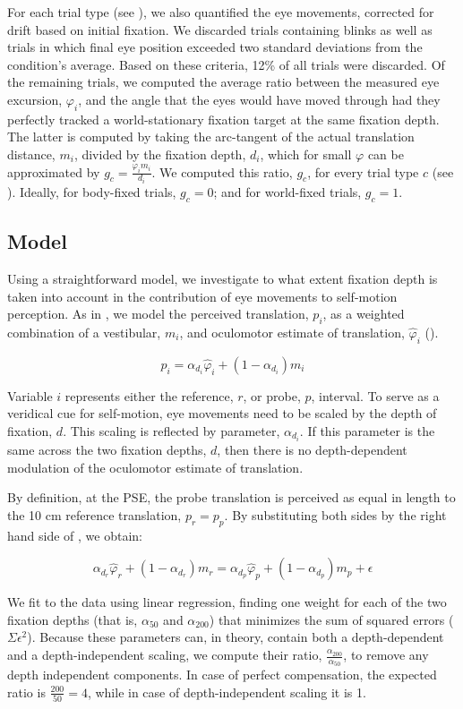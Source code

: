 For each trial type (see ), we also quantified the eye movements, corrected for drift based on initial fixation. We discarded trials containing blinks as well as trials in which final eye position exceeded two standard deviations from the condition's average. Based on these criteria, 12\% of all trials were discarded. Of the remaining trials, we computed the average ratio between the measured eye excursion, $\varphi_i$, and the angle that  the eyes would have  moved through had they perfectly tracked a world-stationary fixation target at the same fixation depth. The latter is computed by taking the arc-tangent of the actual translation distance, $m_i$, divided by the fixation depth, $d_i$, which for small $\varphi$ can be approximated by $g_c = \frac{\varphi_i m_i}{d_i}$. We computed this ratio, $g_c$, for every trial type $c$ (see ). Ideally, for body-fixed trials, $g_c = 0$; and for world-fixed trials, $g_c = 1$.


\subsection{Model}

Using a straightforward model, we investigate to what extent fixation depth is taken into account in the contribution of eye movements to self-motion perception. As in , we model the perceived translation, $p_i$, as a weighted combination of a vestibular, $m_i$, and oculomotor estimate of translation, $\hat{\varphi}_i$ ().

\begin{equation}
\label{p4:eq4}
p_i = \alpha_{d_i} \hat{\varphi}_i + (1 - \alpha_{d_i}) m_i
\end{equation}

Variable $i$ represents either the reference, $r$, or probe, $p$, interval. To serve as a veridical cue for self-motion, eye movements need to be scaled by the depth of fixation, $d$. This scaling is reflected by parameter, $\alpha_{d_i}$. If this parameter is the same across the two fixation depths, $d$, then there is no depth-dependent modulation of the oculomotor estimate of translation.

By definition, at the PSE, the probe translation is perceived as equal in length to the 10 cm reference translation, $p_r = p_p$. By substituting both sides by the right hand side of , we obtain:

\begin{equation}
\label{p4:eq5}
\alpha_{d_r} \hat{\varphi}_r + (1 - \alpha_{d_r}) m_r = \alpha_{d_p} \hat{\varphi}_p + (1 - \alpha_{d_p}) m_p + \epsilon
\end{equation}

We fit  to the data using linear regression, finding one weight for each of the two fixation depths (that is, $\alpha_{50}$ and $\alpha_{200}$) that minimizes the sum of squared errors ($\Sigma \epsilon^2$). Because these parameters can, in theory, contain both a depth-dependent and a depth-independent scaling, we compute their ratio, $\frac{\alpha_{200}}{\alpha_{50}}$, to remove any depth independent components. In case of perfect compensation, the expected ratio is $\frac{200}{50} = 4$, while in case of depth-independent scaling it is 1.
